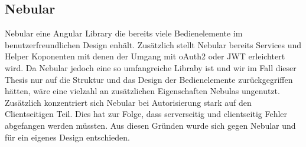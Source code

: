 \documentclass[paper=a4,fontsize=12pt,parskip=half]{scrartcl}
\begin{document}
	\subsection{Nebular}
	\label{sec: nebular}
	Nebular eine Angular Library die bereits viele Bedienelemente im benutzerfreundlichen Design enhält. Zusätzlich stellt Nebular bereits Services und Helper Koponenten mit denen der Umgang mit \gls{oAuth2} oder \gls{JWT} erleichtert wird. Da Nebular jedoch eine so umfangreiche Libraby ist und wir im Fall dieser Thesis nur auf die Struktur und das Design der Bedienelemente zurückgegriffen hätten, wäre eine vielzahl an zusätzlichen Eigenschaften Nebulas ungenutzt. Zusätzlich konzentriert sich Nebular bei Autorisierung stark auf den Clientseitigen Teil. Dies hat zur Folge, dass serverseitig und clientseitig Fehler abgefangen werden müssten. Aus diesen Gründen wurde sich gegen Nebular und für ein eigenes Design entschieden.
	
\end{document}
